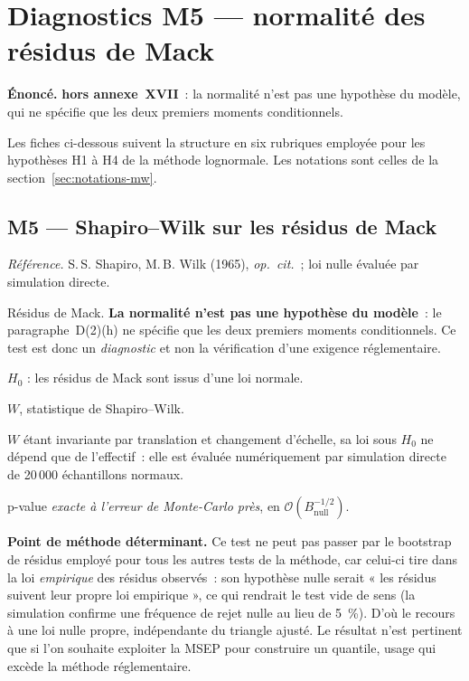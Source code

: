 \documentclass[a4paper,11pt]{article}
\newcommand{\refl}[1]{{\small\textcolor{maincolor!70!black}{\textit{Référence.} #1}}\par\smallskip}
\newcounter{ficheid}
\newenvironment{fiche}[1]{%
  \stepcounter{ficheid}%
  \phantomsection
  \subsection{#1}%
  \label{fiche:\theficheid}%
}{%
  \end{description}\vspace{0.5em}%
}
\newcommand{\Cadre}{%
  \begin{description}[leftmargin=0pt, style=unboxed, itemsep=3pt, topsep=3pt, parsep=2pt]%
  \item[\textcolor{financeblue}{\textbf{1. Cadre, notations et hypothèses de validité (non testées).}}]}
\newcommand{\Hzero}{\item[\textcolor{financeblue}{\textbf{2. Hypothèse nulle.}}]}
\newcommand{\Stat}{\item[\textcolor{financeblue}{\textbf{3. Statistique de test.}}]}
\newcommand{\Loi}{\item[\textcolor{financeblue}{\textbf{4. Loi sous $H_0$.}}]}
\newcommand{\Pval}{\item[\textcolor{financeblue}{\textbf{5. p-value.}}]}
\newcommand{\Usage}{\item[\textcolor{financeblue}{\textbf{6. Usage et limites.}}]}
\begin{document}
\clearpage
\section{Diagnostics M5 --- normalité des résidus de Mack}
\label{sec:mwm5}

\begin{encadre}
\textbf{Énoncé.} \textbf{hors annexe~XVII}~: la normalité n'est pas une hypothèse du modèle, qui ne spécifie que les deux premiers moments conditionnels.
\end{encadre}

Les fiches ci-dessous suivent la structure en six rubriques employée pour les
hypothèses H1 à H4 de la méthode lognormale. Les notations sont celles de la
section~\ref{sec:notations-mw}.

\begin{fiche}{M5 --- Shapiro--Wilk sur les résidus de Mack}
\label{mw:m5sw}
\refl{S.\,S. Shapiro, M.\,B. Wilk (1965), \emph{op.\ cit.}~; loi nulle évaluée
par simulation directe.}
\Cadre
Résidus de Mack. \textbf{La normalité n'est pas une hypothèse du modèle}~: le
paragraphe~D(2)(h) ne spécifie que les deux premiers moments conditionnels. Ce
test est donc un \emph{diagnostic} et non la vérification d'une exigence
réglementaire.
\Hzero
$H_0$ : les résidus de Mack sont issus d'une loi normale.
\Stat
$W$, statistique de Shapiro--Wilk.
\Loi
$W$ étant invariante par translation et changement d'échelle, sa loi sous $H_0$
ne dépend que de l'effectif~: elle est évaluée numériquement par simulation
directe de 20\,000 échantillons normaux.
\Pval
p-value \emph{exacte à l'erreur de Monte-Carlo près}, en
$\mathcal{O}(B_{\text{null}}^{-1/2})$.
\Usage
\textbf{Point de méthode déterminant.} Ce test ne peut pas passer par le
bootstrap de résidus employé pour tous les autres tests de la méthode, car
celui-ci tire dans la loi \emph{empirique} des résidus observés~: son hypothèse
nulle serait « les résidus suivent leur propre loi empirique », ce qui rendrait
le test vide de sens (la simulation confirme une fréquence de rejet nulle au
lieu de 5~\%). D'où le recours à une loi nulle propre, indépendante du triangle
ajusté. Le résultat n'est pertinent que si l'on souhaite exploiter la MSEP pour
construire un quantile, usage qui excède la méthode réglementaire.
\end{fiche}
\end{document}
